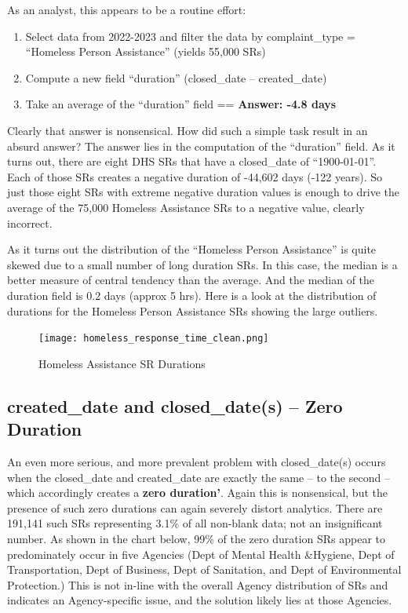 \documentclass[12pt, titlepage]{article}
\begin{document}
{		As an analyst, this appears to be a routine effort: 
		
		\begin{enumerate}
		    \item Select data from 2022-2023 and filter the data by complaint\_type = ``Homeless Person Assistance'' (yields 55,000 SRs)
		    \item Compute a new field ``duration'' (closed\_date – created\_date)
		    \item Take an average of the ``duration'' field == \textbf{Answer:  -4.8 days}  
		\end{enumerate}
		
		Clearly that answer is nonsensical. How did such a simple task result in an absurd answer? The answer lies in the computation of the
		``duration'' field. As it turns out, there are eight DHS SRs that have a closed\_date of ``1900-01-01''. Each of those SRs creates a 
		negative duration of -44,602 days (-122 years). So just those eight SRs with extreme negative duration values is enough to drive
		the average of the 75,000 Homeless Assistance SRs to a negative value, clearly incorrect.
		
		As it turns out the distribution of the ``Homeless Person Assistance'' is quite skewed due to a small number of long duration
		SRs. In this case, the median is a better measure of central tendency than the average. And the median of the duration
		field is  0.2 days (approx 5 hrs). Here is a look at the distribution of durations for the Homeless Person Assistance SRs showing
		the large outliers. 
		
		\begin{figure}[H]
		 	 \centering
			  \texttt{[image: homeless\_response\_time\_clean.png]}
			  \caption{Homeless Assistance SR Durations}
			  \label{fig:homeless}
		\end{figure}
		
	\subsection{created\_date and closed\_date(s) --  Zero Duration}		
	An even more serious, and more prevalent problem with closed\_date(s) occurs when the closed\_date and created\_date
	are exactly the same -- to the second -- which accordingly creates a \textbf{zero duration'}. Again this is nonsensical, but the
	presence of such zero durations can again severely distort analytics. There are 191,141 such SRs representing 3.1\% of all 
	non-blank data; not an insignificant number. As shown in the chart below, 99\% of the zero duration SRs appear to predominately
	occur in five Agencies (Dept of Mental Health \&Hygiene, Dept of Transportation, Dept of Business, Dept of Sanitation,
	and Dept of Environmental Protection.) This is not in-line with the overall Agency distribution of SRs and indicates an
	Agency-specific issue, and the solution likely lies at those Agencies.
	
}
\end{document}
